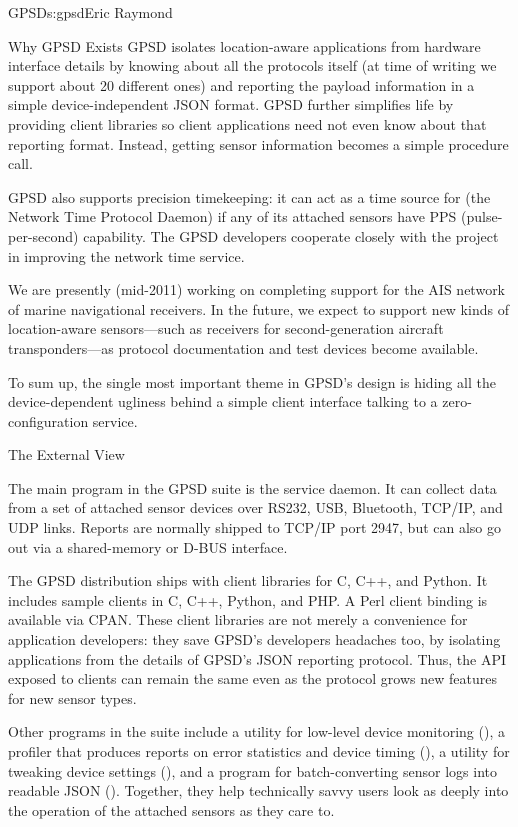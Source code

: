 \begin{aosachapter}{GPSD}{s:gpsd}{Eric Raymond}
\begin{aosasect1}{Why GPSD Exists}
GPSD isolates location-aware applications from hardware interface
details by knowing about all the protocols itself (at time of writing
we support about 20 different ones) and reporting the payload
information in a simple device-independent JSON format.  GPSD further
simplifies life by providing client libraries so client applications
need not even know about that reporting format.  Instead, getting
sensor information becomes a simple procedure call.

GPSD also supports precision timekeeping: it can act as a time source
for  (the Network Time Protocol Daemon) if any of its
attached sensors have PPS (pulse-per-second) capability. The GPSD
developers cooperate closely with the  project in improving
the network time service.

We are presently (mid-2011) working on completing support for the AIS
network of marine navigational receivers.  In the future, we expect to
support new kinds of location-aware sensors---such as receivers for
second-generation aircraft transponders---as protocol documentation
and test devices become available.

To sum up, the single most important theme in GPSD's design is
hiding all the device-dependent ugliness behind a simple client
interface talking to a zero-configuration service.

\end{aosasect1}

\begin{aosasect1}{The External View}

The main program in the GPSD suite is the  service daemon.
It can collect data from a set of attached sensor devices over RS232,
USB, Bluetooth, TCP/IP, and UDP links. Reports are normally shipped to
TCP/IP port 2947, but can also go out via a shared-memory or D-BUS
interface.

The GPSD distribution ships with client libraries for C, C++, and
Python.  It includes sample clients in C, C++, Python, and PHP. A Perl
client binding is available via CPAN.  These client libraries are not
merely a convenience for application developers: they save GPSD's
developers headaches too, by isolating applications from the details
of GPSD's JSON reporting protocol.  Thus, the API exposed to clients
can remain the same even as the protocol grows new features for new
sensor types.

Other programs in the suite include a utility for low-level device
monitoring (), a profiler that produces reports on error
statistics and device timing (), a utility for tweaking
device settings (), and a program for batch-converting
sensor logs into readable JSON (). Together, they help
technically savvy users look as deeply into the operation of the
attached sensors as they care to.


\end{aosasect1}
\end{aosachapter}
